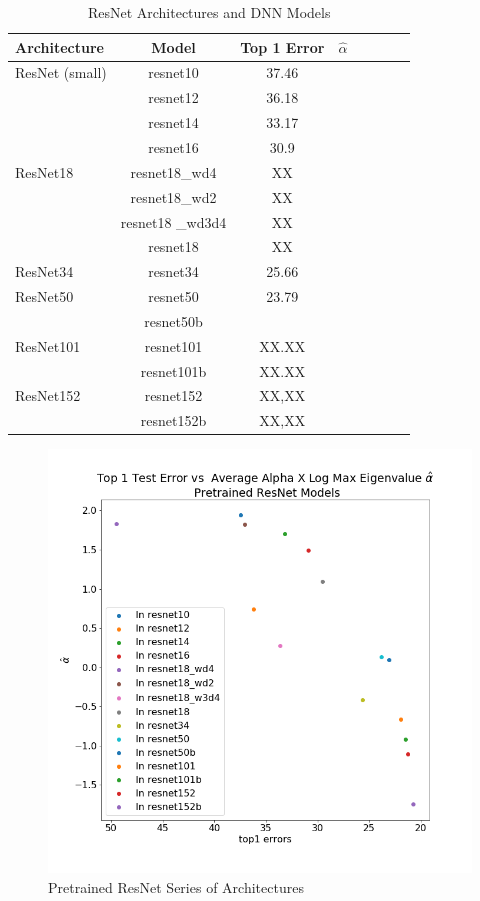 \begin{table}[t]
\small
\begin{center}
\begin{tabular}{|p{1in}|c|c|c|c|c|c|c|}
\hline
Architecture 
 & Model
 & Top 1 Error & $\hat{\alpha}$ \\
\hline
ResNet (small)  & resnet10 & 37.46 & \\
& resnet12 & 36.18 & \\
& resnet14 & 33.17 & \\
& resnet16 & 30.9 & \\
\hline
ResNet18 & resnet18\_wd4 & XX & \\
& resnet18\_wd2 & XX & \\
& resnet18 \_wd3d4& XX & \\
& resnet18 & XX & \\

\hline
ResNet34 & resnet34 & 25.66 & \\
\hline
ResNet50 & resnet50 & 23.79 & \\
& resnet50b &  & \\

\hline
ResNet101 & resnet101 & XX.XX & \\
& resnet101b & XX.XX & \\
\hline
ResNet152 & resnet152 & XX,XX & \\
& resnet152b & XX,XX & \\
\hline
\end{tabular}
\end{center}
\caption{ResNet Architectures and DNN Models}
\label{table:models}
\end{table}


\begin{figure}[!htb]
 \centering
   \includegraphics[scale=0.30]{img/ResNet-w_alphas.png}
   \caption{
Pretrained ResNet Series of Architectures}
  \label{fig:resnet}
\end{figure}






